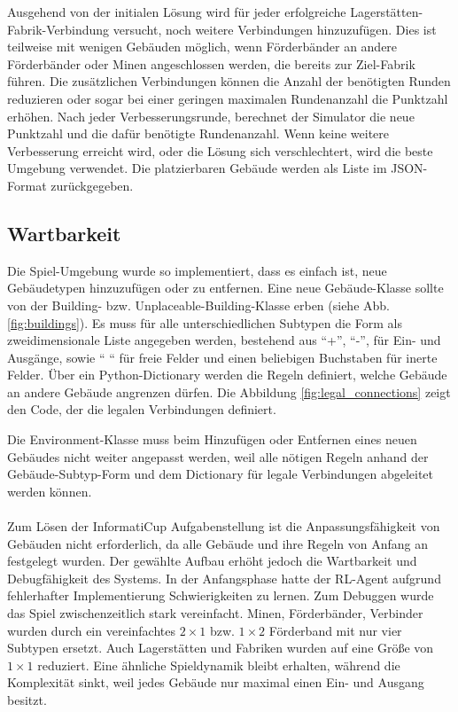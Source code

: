 Ausgehend von der initialen Lösung wird für jeder erfolgreiche Lagerstätten-Fabrik-Verbindung versucht, noch weitere Verbindungen hinzuzufügen. Dies ist teilweise mit wenigen Gebäuden möglich, wenn Förderbänder an andere Förderbänder oder Minen angeschlossen werden, die bereits zur Ziel-Fabrik führen. Die zusätzlichen Verbindungen können die Anzahl der benötigten Runden reduzieren oder sogar bei einer geringen maximalen Rundenanzahl die Punktzahl erhöhen. 
Nach jeder Verbesserungsrunde, berechnet der Simulator die neue Punktzahl und die dafür benötigte Rundenanzahl. Wenn keine weitere Verbesserung erreicht wird, oder die Lösung sich verschlechtert, wird die beste Umgebung verwendet. Die platzierbaren Gebäude werden als Liste im JSON-Format zurückgegeben.

\subsection{Wartbarkeit}
Die Spiel-Umgebung wurde so implementiert, dass es einfach ist, neue Gebäudetypen hinzuzufügen oder zu entfernen. Eine neue Gebäude-Klasse sollte von der Building- bzw. Unplaceable-Building-Klasse erben (siehe Abb. \ref{fig:buildings}). Es muss für alle unterschiedlichen Subtypen die Form als zweidimensionale Liste angegeben werden, bestehend aus “+”, “-”, für Ein- und Ausgänge, sowie “ “ für freie Felder und einen beliebigen Buchstaben für inerte Felder. 
Über ein Python-Dictionary werden die Regeln definiert, welche Gebäude an andere Gebäude angrenzen dürfen. 
Die Abbildung \ref{fig:legal_connections} zeigt den Code, der die legalen Verbindungen definiert.

Die Environment-Klasse muss beim Hinzufügen oder Entfernen eines neuen Gebäudes nicht weiter angepasst werden, weil alle nötigen Regeln anhand der Gebäude-Subtyp-Form und dem Dictionary für legale Verbindungen abgeleitet werden können.
\\\\
Zum Lösen der InformatiCup Aufgabenstellung ist die Anpassungsfähigkeit von Gebäuden nicht erforderlich, da alle Gebäude und ihre Regeln von Anfang an festgelegt wurden. 
Der gewählte Aufbau erhöht jedoch die Wartbarkeit und Debugfähigkeit des Systems. 
In der Anfangsphase hatte der RL-Agent aufgrund fehlerhafter Implementierung Schwierigkeiten zu lernen. Zum Debuggen wurde das Spiel zwischenzeitlich stark vereinfacht. Minen, Förderbänder, Verbinder wurden durch ein vereinfachtes $2\times1$ bzw. $1\times2$ Förderband mit nur vier Subtypen ersetzt. Auch Lagerstätten und Fabriken wurden auf eine Größe von $1\times1$ reduziert. Eine ähnliche Spieldynamik bleibt erhalten, während die Komplexität sinkt, weil jedes Gebäude nur maximal einen Ein- und Ausgang besitzt. 




